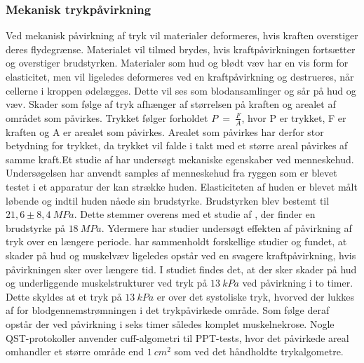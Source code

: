 \subsubsection{Mekanisk trykpåvirkning}
Ved mekanisk påvirkning af tryk vil materialer deformeres, hvis kraften overstiger deres flydegrænse. Materialet vil tilmed brydes, hvis kraftpåvirkningen fortsætter og overstiger brudstyrken. Materialer som hud og blødt væv har en vis form for elasticitet, men vil ligeledes deformeres ved en kraftpåvirkning og destrueres, når cellerne i kroppen ødelægges. Dette vil ses som blodansamlinger og sår på hud og væv. Skader som følge af tryk afhænger af størrelsen på kraften og arealet af området som påvirkes. Trykket følger forholdet $P~=~\frac{F}{A}$, hvor P er trykket, F er kraften og A er arealet som påvirkes. Arealet som påvirkes har derfor stor betydning for trykket, da trykket vil falde i takt med et større areal påvirkes af samme kraft.Et studie af  har undersøgt mekaniske egenskaber ved menneskehud. Undersøgelsen har anvendt samples af menneskehud fra ryggen som er blevet testet i et apparatur der kan strække huden. Elasticiteten af huden er blevet målt løbende og indtil huden nåede sin brudstyrke. Brudstyrken blev bestemt til $21,6 \pm 8,4~MPa$. Dette stemmer overens med et studie af , der finder en brudstyrke på $18~MPa$. Ydermere har studier undersøgt effekten af påvirkning af tryk over en længere periode.  har sammenholdt forskellige studier og fundet, at skader på hud og muskelvæv ligeledes opstår ved en svagere kraftpåvirkning, hvis påvirkningen sker over længere tid. I studiet findes det, at der sker skader på hud og underliggende muskelstrukturer ved tryk på $13~kPa$ ved påvirkning i to timer. Dette skyldes at et tryk på $13~kPa$ er over det systoliske tryk, hvorved der lukkes af for blodgennemstrømningen i det trykpåvirkede område. Som følge deraf opstår der ved påvirkning i seks timer således komplet muskelnekrose. \citep{sanders1995} Nogle QST-protokoller anvender cuff-algometri til PPT-tests, hvor det påvirkede areal omhandler et større område end $1~cm^{2}$ som ved det håndholdte trykalgometre. 

